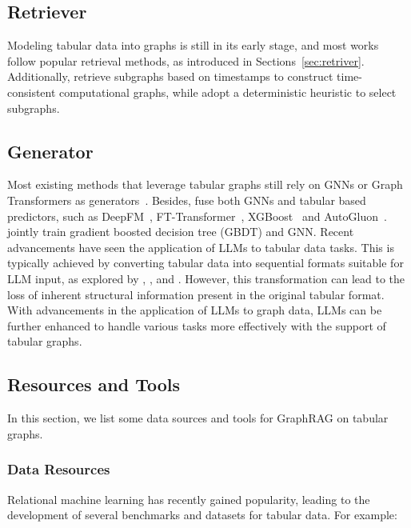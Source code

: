 \subsection{Retriever}
Modeling tabular data into graphs is still in its early stage, and most works follow popular retrieval methods, as introduced in Sections~\ref{sec:retriver}. Additionally, \citet{fey2023relational} retrieve subgraphs based on timestamps to construct time-consistent computational graphs, while \citet{cvitkovic2020supervised} adopt a deterministic heuristic to select subgraphs.

\subsection{Generator}
Most existing methods that leverage tabular graphs still rely on GNNs or Graph Transformers as generators~\citep{li2024graph}. Besides, \citet{wang20244dbinfer} fuse both GNNs and tabular based predictors, such as DeepFM~\citep{guo2017deepfm}, FT-Transformer~\citep{gorishniy2021revisiting}, XGBoost~\citep{chen2016xgboost} and AutoGluon~\citep{erickson2020autogluon}. \citet{ivanov2021boost} jointly train gradient boosted decision tree (GBDT) and GNN. Recent advancements have seen the application of LLMs to tabular data tasks. This is typically achieved by converting tabular data into sequential formats suitable for LLM input, as explored by \citet{fang2024large}, \citet{dong2024large}, and \citet{sui2024table}. However, this transformation can lead to the loss of inherent structural information present in the original tabular format. With advancements in the application of LLMs to graph data, LLMs can be further enhanced to handle various tasks more effectively with the support of tabular graphs.

\subsection{Resources and Tools}
In this section, we list some data sources and tools for GraphRAG on tabular graphs.

\subsubsection{Data Resources}
Relational machine learning has recently gained popularity, leading to the development of several benchmarks and datasets for tabular data. For example:

